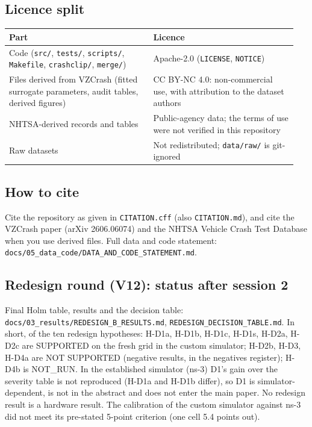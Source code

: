 \subsection*{Licence split}

{\scriptsize\raggedright
\begin{longtable}{p{0.475\linewidth}p{0.475\linewidth}}
\toprule
Part & Licence \\
\midrule
\endhead
Code (\texttt{src/}, \texttt{tests/}, \texttt{scripts/}, \texttt{Makefile}, \texttt{crashclip/}, \texttt{merge/}) & Apache-2.0 (\texttt{LICENSE}, \texttt{NOTICE}) \\
Files derived from VZCrash (fitted surrogate parameters, audit tables, derived figures) & CC BY-NC 4.0: non-commercial use, with attribution to the dataset authors \\
NHTSA-derived records and tables & Public-agency data; the terms of use were not verified in this repository \\
Raw datasets & Not redistributed; \texttt{data/raw/} is git-ignored \\
\bottomrule
\end{longtable}}

\subsection*{How to cite}

Cite the repository as given in \texttt{CITATION.cff} (also \texttt{CITATION.md}), and cite the VZCrash paper (arXiv 2606.06074) and the NHTSA Vehicle Crash Test Database when you use derived files. Full data and code statement: \texttt{docs/05\_data\_code/DATA\_AND\_CODE\_STATEMENT.md}.

\subsection*{Redesign round (V12): status after session 2}

Final Holm table, results and the decision table: \texttt{docs/03\_results/REDESIGN\_B\_RESULTS.md}, \texttt{REDESIGN\_DECISION\_TABLE.md}. In short, of the ten redesign hypotheses: H-D1a, H-D1b, H-D1c, H-D1s, H-D2a, H-D2c are SUPPORTED on the fresh grid in the custom simulator; H-D2b, H-D3, H-D4a are NOT SUPPORTED (negative results, in the negatives register); H-D4b is NOT\_RUN. In the established simulator (ns-3) D1's gain over the severity table is not reproduced (H-D1a and H-D1b differ), so D1 is simulator-dependent, is not in the abstract and does not enter the main paper. No redesign result is a hardware result. The calibration of the custom simulator against ns-3 did not meet its pre-stated 5-point criterion (one cell 5.4 points out).

